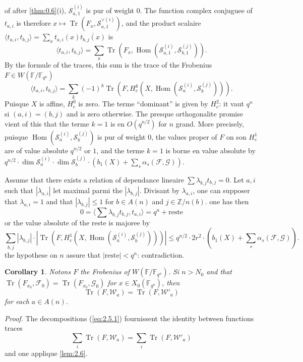 \documentclass[11pt,a4paper]{article}
\theoremstyle{plain}
\newtheorem{corollary}[theorem]{Corollary}
\theoremstyle{definition}
\DeclareMathOperator{\Hom}{Hom}
\DeclareMathOperator{\tr}{Tr}
\begin{document}
of after \ref{thm:0.6}(i), $\mathcal{S}_{a,1}^{(i)}$ is pur of weight $0$. The function complex conjuguee of $t_{a,i}$ is therefore $x \mapsto \tr(F_x, \mathcal{S}_{a,1}^{\vee(i)})$, and the product scalaire $\langle t_{a,i}, t_{b,j} \rangle = \sum_x t_{a,i}(x) \overline{t_{b,j}(x)}$ is
\[
\langle t_{a,i}, t_{b,j} \rangle = \sum_x \tr(F_x, \Hom(\mathcal{S}_{a,1}^{(i)}, \mathcal{S}_{b,1}^{(j)})).
\]
By the formule of the traces, this sum is the trace of the Frobenius $F \in W(\mathbb{F}/\mathbb{F}_{q^n})$
\begin{equation}\label{eq:2.6.1}
\langle t_{a,i}, t_{b,j} \rangle = \sum_k (-1)^k \tr(F, H_c^k(X, \Hom(\mathcal{S}_a^{(i)}, \mathcal{S}_b^{(j)}))).
\end{equation}
Puisque $X$ is affine, $H_c^0$ is zero. The terme ``dominant'' is given by $H_c^2$: it vaut $q^n$ si $(a,i) = (b,j)$ and is zero otherwise. The presque orthogonalite promise vient of this that the terme $k=1$ is en $O(q^{n/2})$ for $n$ grand. More precisely, puisque $\Hom(\mathcal{S}_a^{(i)}, \mathcal{S}_b^{(j)})$ is pur of weight $0$, the values proper of $F$ on son $H_c^1$ are of value absolute $q^{n/2}$ or $1$, and the terme $k=1$ is borne en value absolute by $q^{n/2} \cdot \dim \mathcal{S}_a^{(i)} \cdot \dim \mathcal{S}_b^{(j)} \cdot (b_1(X) + \sum_s \alpha_s(\mathcal{F}, \mathcal{G}))$.

Assume that there exists a relation of dependance lineaire $\sum \lambda_{b,j} t_{b,j} = 0$. Let $a,i$ such that $|\lambda_{a,i}|$ let maximal parmi the $|\lambda_{b,j}|$. Divisant by $\lambda_{a,i}$, one can supposer that $\lambda_{a,i} = 1$ and that $|\lambda_{b,j}| \leq 1$ for $b \in A(n)$ and $j \in \mathbb{Z}/n(b)$. one has then
\[
0 = \langle \sum \lambda_{b,j} t_{b,j}, t_{a,i} \rangle = q^n + \text{reste}
\]
or the value absolute of the reste is majoree by
\[
\sum_{b,j} |\lambda_{b,j}| \cdot |\tr(F, H_c^1(X, \Hom(\mathcal{S}_a^{(i)}, \mathcal{S}_b^{(j)})))| \leq q^{n/2} \cdot 2r^2 \cdot (b_1(X) + \sum_s \alpha_s(\mathcal{F}, \mathcal{G})).
\]
the hypothese on $n$ assure that $|\text{reste}| < q^n$: contradiction.

\begin{corollary}\label{cor:2.7}
Notons $F$ the Frobenius of $W(\mathbb{F}/\mathbb{F}_{q^n})$. Si $n > N_0$ and that $\tr(F_{x_0}, \mathcal{F}_0) = \tr(F_{x_0}, \mathcal{G}_0)$ for $x \in X_0(\mathbb{F}_{q^n})$, then
\[
\tr(F, \mathcal{W}_a) = \tr(F, \mathcal{W}'_a)
\]
for each $a \in A(n)$.
\end{corollary}

\noindent\textit{Proof.} The decompositions (\ref{eq:2.5.1}) fournissent the identity between functions traces
\[
\sum_i \tr(F, \mathcal{W}_a) = \sum_i \tr(F, \mathcal{W}'_a)
\]
and one applique \ref{lem:2.6}.
\end{document}
